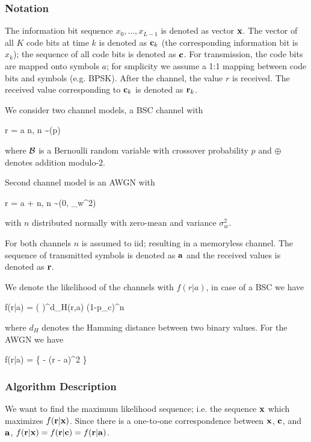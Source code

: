 \subsubsection{Notation}

The information bit sequence $x_0, \ldots, x_{L-1}$ is denoted as vector $\mathbf{x}$. The vector of all $K$ code bits at time $k$ is denoted as $\mathbf{c}_k$ (the corresponding information bit is $x_k$); the sequence of all code bits is denoted as $\mathbf{c}$. For transmission, the code bits are mapped onto symbols $a$; for smplicity we assume a 1:1 mapping between code bits and symbols (e.g. BPSK). After the channel, the value $r$ is received. The received value corresponding to $\mathbf{c}_k$ is denoted as $\mathbf{r}_k$.

We consider two channel models, a BSC channel with 

\bee
r = a \oplus n, \quad n \sim \Bc(p)
\eee

where $\mathcal{B}$ is a Bernoulli random variable with crossover probability $p$ and $\oplus$ denotes addition modulo-$2$.

Second channel model is an AWGN with

\bee
r = a + n, \quad n \sim \Nc(0, \sigma_w^2)
\eee

with $n$ distributed normally with zero-mean and variance $\sigma_{w}^2$.

For both channels $n$ is assumed to iid; resulting in a memoryless channel. The sequence of transmitted symbols is denoted as $\mathbf{a}$ and the received values is denoted as $\mathbf{r}$.

We denote the likelihood of the channels with $f(r|a)$, in case of a BSC we have

\bee
f(r|a) = \left( \right)^{d_H(r,a)} (1-p_c)^n
\eee

where $d_H$ denotes the Hamming distance between two binary values. For the AWGN we have

\bee
f(r|a) =  \exp \left\{ -  (r - a)^2 \right\}
\eee

\subsubsection{Algorithm Description}

We want to find the maximum likelihood sequence; i.e. the sequence $\mathbf{x}$ which maximizes $f(\mathbf{r}|\mathbf{x})$. Since there is a one-to-one correspondence between $\mathbf{x}$, $\mathbf{c}$, and $\mathbf{a}$, $f(\mathbf{r}|\mathbf{x}) = f(\mathbf{r}|\mathbf{c}) = f(\mathbf{r}|\mathbf{a})$.

